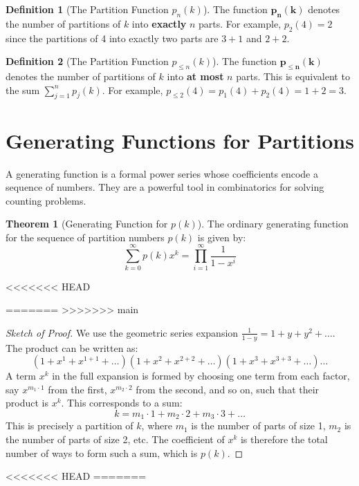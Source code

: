 \documentclass{article}
\theoremstyle{definition}
\newtheorem{definition}{Definition}
\newtheorem{theorem}{Theorem}
\begin{document}
\begin{definition}[The Partition Function $p_n(k)$]
  The function $\boldsymbol{p_n(k)}$ denotes the number of partitions of $k$ into \textbf{exactly} $n$ parts. For example, $p_2(4)=2$ since the partitions of 4 into exactly two parts are $3+1$ and $2+2$.
\end{definition}

\begin{definition}[The Partition Function $p_{\le n}(k)$]
  The function $\boldsymbol{p_{\le n}(k)}$ denotes the number of partitions of $k$ into \textbf{at most} $n$ parts. This is equivalent to the sum $\sum_{j=1}^{n} p_j(k)$. For example, $p_{\le 2}(4) = p_1(4) + p_2(4) = 1 + 2 = 3$.
\end{definition}

\section{Generating Functions for Partitions}
A generating function is a formal power series whose coefficients encode a sequence of numbers. They are a powerful tool in combinatorics for solving counting problems.

\begin{theorem}[Generating Function for $p(k)$]
  The ordinary generating function for the sequence of partition numbers $p(k)$ is given by:
  $$ \sum_{k=0}^{\infty} p(k)x^k = \prod_{i=1}^{\infty} \frac{1}{1-x^i} $$
\end{theorem}
<<<<<<< HEAD

=======
>>>>>>> main
\begin{proof}[Sketch of Proof]
  We use the geometric series expansion $\frac{1}{1-y} = 1 + y + y^2 + \dots$.
  The product can be written as:
  $$ (1+x^1+x^{1+1}+\dots)(1+x^2+x^{2+2}+\dots)(1+x^3+x^{3+3}+\dots)\dots $$
  A term $x^k$ in the full expansion is formed by choosing one term from each factor, say $x^{m_1 \cdot 1}$ from the first, $x^{m_2 \cdot 2}$ from the second, and so on, such that their product is $x^k$. This corresponds to a sum:
  $$ k = m_1 \cdot 1 + m_2 \cdot 2 + m_3 \cdot 3 + \dots $$
  This is precisely a partition of $k$, where $m_1$ is the number of parts of size 1, $m_2$ is the number of parts of size 2, etc. The coefficient of $x^k$ is therefore the total number of ways to form such a sum, which is $p(k)$.
\end{proof}

<<<<<<< HEAD
=======
\end{document}
